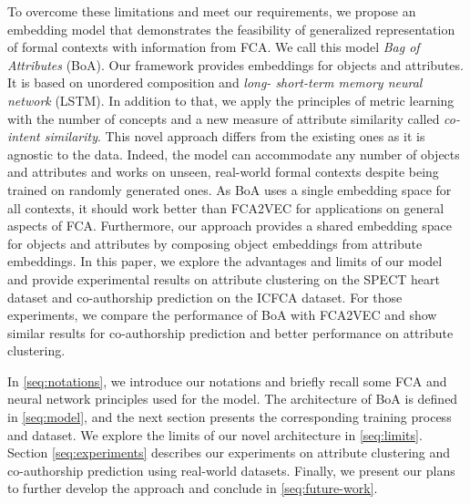 To overcome these limitations and meet our requirements, we propose an embedding model that demonstrates the feasibility of generalized representation of formal contexts with information from FCA.
We call this model \textit{Bag of Attributes} (BoA).
Our framework provides embeddings for objects and attributes.
It is based on unordered composition and \textit{long- short-term memory neural network} (LSTM).
In addition to that, we apply the principles of metric learning with the number of concepts and a new measure of attribute similarity called \textit{co-intent similarity}.
This novel approach differs from the existing ones as it is agnostic to the data.
Indeed, the model can accommodate any number of objects and attributes and works on unseen, real-world formal contexts despite being trained on randomly generated ones.
As BoA uses a single embedding space for all contexts, it should work better than FCA2VEC for applications on general aspects of FCA.
Furthermore, our approach provides a shared embedding space for objects and attributes by composing object embeddings from attribute embeddings.
In this paper, we explore the advantages and limits of our model and provide experimental results on attribute clustering on the SPECT heart dataset and co-authorship prediction on the ICFCA dataset.
For those experiments, we compare the performance of BoA with FCA2VEC and show similar results for co-authorship prediction and better performance on attribute clustering.

In \autoref{seq:notations}, we introduce our notations and briefly recall some FCA and neural network principles used for the model.
The architecture of BoA is defined in \autoref{seq:model}, and the next section presents the corresponding training process and dataset.
We explore the limits of our novel architecture in \autoref{seq:limits}.
Section \ref{seq:experiments} describes our experiments on attribute clustering and co-authorship prediction using real-world datasets.
Finally, we present our plans to further develop the approach and conclude in \autoref{seq:future-work}.
